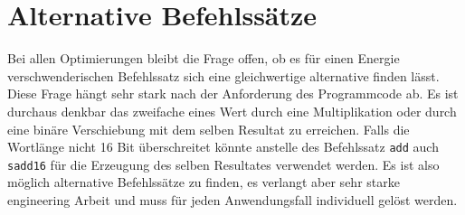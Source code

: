 \section{Alternative Befehlssätze}
\label{sec:alternative_befehlsaetze}
Bei allen Optimierungen bleibt die Frage offen, ob es für einen Energie verschwenderischen Befehlssatz sich eine gleichwertige alternative finden lässt. Diese Frage hängt sehr stark nach der Anforderung des Programmcode ab. Es ist durchaus denkbar das zweifache eines Wert durch eine Multiplikation oder durch eine binäre Verschiebung mit dem selben Resultat zu erreichen. Falls die Wortlänge nicht 16 Bit überschreitet könnte anstelle des Befehlssatz \texttt{add} auch \texttt{sadd16} für die Erzeugung des selben Resultates verwendet werden. Es ist also möglich alternative Befehlssätze zu finden, es verlangt aber sehr starke engineering Arbeit und muss für jeden Anwendungsfall individuell gelöst werden.


